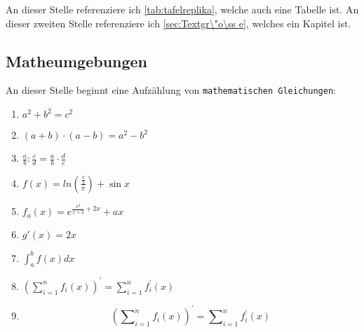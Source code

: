 \documentclass[12pt, a4paper]{article} %
\begin{document}
An dieser Stelle referenziere ich \ref{tab:tafelreplika}, welche auch eine Tabelle ist.
An dieser zweiten Stelle referenziere ich \ref{sec:Textgr\"o\ss e}, welches ein Kapitel ist.


\subsection{Matheumgebungen}

An dieser Stelle beginnt eine Aufzählung von \texttt{mathematischen Gleichungen}:

\begin{enumerate}
    \item $a^2 + b^2 = c^2$
    \item $(a+b)\cdot(a-b)=a^2-b^2$
    \item $\frac{a}{b}:\frac{c}{d}=\frac{a}{b}\cdot\frac{d}{c}$
    \item $f(x)=ln(\frac{\frac{x}{2}}{\pi})+\sin{x}$
    \item $f_{a}(x)=e^{\frac{x^2}{x+2}+2x}+ax$
    \item $g\prime(x)=2x$
    \item $\int_{a}^{b} f(x)dx$
    \item $(\sum\nolimits_{i=1}^n f_{i}(x))^\prime=\sum\nolimits_{i=1}^n f^\prime_{i}(x)$
    \item \[ (\sum\nolimits_{i=1}^n f_{i}(x))^\prime=\sum\nolimits_{i=1}^n f^\prime_{i}(x) \] 
\end{enumerate}
\end{document}
